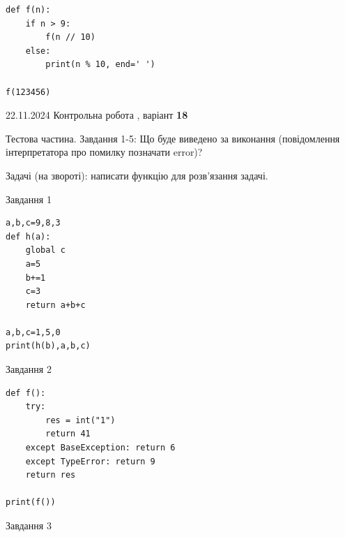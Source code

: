 \documentclass[12pt, ukrainian]{article}
\begin{document}
{{{{{{{{{{{{{{{{{\begin{minipage}[t]{10.7cm}
\begin{verbatim}
def f(n):
    if n > 9:
        f(n // 10)
    else:
        print(n % 10, end=' ')

f(123456)
\end{verbatim}


\end{minipage}

\newpage

{{22.11.2024 Контрольна робота , варіант  \No \textbf { 18 }\par}}
{

Тестова частина. Завдання 1-5: Що буде виведено за виконання (повідомлення інтерпретатора про помилку позначати error)?

Задачі (на звороті): написати функцію для розв'язання задачі.

\vspace{5mm} \begin{minipage}[t]{8.5cm}
               
{\begin{center}Завдання {1}\end{center}}
\vspace{-6mm}

\begin{verbatim}
a,b,c=9,8,3
def h(a):
    global c
    a=5
    b+=1
    c=3
    return a+b+c

a,b,c=1,5,0
print(h(b),a,b,c)
\end{verbatim}


\vspace{5mm}
               
{\begin{center}Завдання {2}\end{center}}
\vspace{-6mm}

\begin{verbatim}
def f():
    try:
        res = int("1")
        return 41
    except BaseException: return 6
    except TypeError: return 9
    return res

print(f())
\end{verbatim}


\vspace{5mm}
               
{\begin{center}Завдання {3}\end{center}}
\vspace{-6mm}


\end{minipage}}}}}}}}}}}}}}}}}}}
\end{document}

